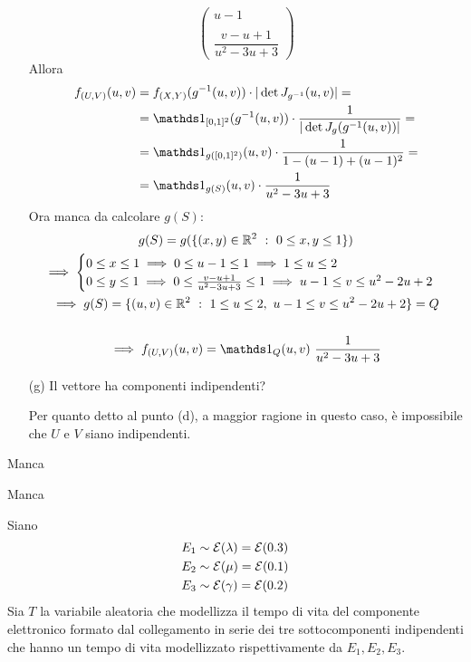 \begin{enumerate}
\[\begin{pmatrix}
u-1 \\ \, \\\dfrac{v-u+1}{u^2-3u+3}
\end{pmatrix}
\]
Allora
\begin{gather*}
\begin{aligned}
f_{(U,V)}(u,v)&=\fXY(g^{-1}(u,v))\cdot |\det J_{g^{-1}}(u,v)|=\\
&=\Ind_{[0,1]^2}(g^{-1}(u,v))\cdot\frac{1}{|\det J_g(g^{-1}(u,v))|}=\\
&=\Ind_{g([0,1]^2)}(u,v)\cdot\frac{1}{1-(u-1)+(u-1)^2}=\\
&=\Ind_{g(S)}(u,v)\cdot\frac{1}{u^2-3u+3}
\end{aligned}
\end{gather*}
Ora manca da calcolare $g(S)$:
\begin{gather*}
g(S)=g(\{(x,y)\in\RR^2\ :\ 0\leq x,y\leq 1 \}) \\
\implies \begin{cases}0\leq x\leq 1\implies 0\leq u-1\leq 1\implies 1\leq u \leq 2 \\ 0\leq y\leq 1\implies 0\leq \frac{v-u+1}{u^2-3u+3} \leq 1 \implies u-1\leq v\leq u^2-2u+2   \end{cases} \\
\implies g(S)=\{(u,v)\in\RR^2\ :\ 1\leq u \leq 2,\ u-1\leq v\leq u^2-2u+2 \}=Q\\
\, \\
\implies f_{(U,V)}(u,v)=\Ind_Q(u,v)\ \frac{1}{u^2-3u+3}
\end{gather*}

\item [(g)] Il vettore ha componenti indipendenti?

Per quanto detto al punto (d), a maggior ragione in questo caso, è impossibile che $U$ e $V$ siano indipendenti.

\end{enumerate}

\Soluzione{}
Manca

\Soluzione{}
Manca

\Soluzione{}
Siano 
\begin{align*}
E_1&\sim\mathcal{E}(\lambda)=\mathcal{E}(0.3) \\
E_2&\sim\mathcal{E}(\mu)=\mathcal{E}(0.1) \\
E_3&\sim\mathcal{E}(\gamma)=\mathcal{E}(0.2)
\end{align*}
Sia $T$ la variabile aleatoria che modellizza il tempo di vita del componente elettronico formato dal collegamento in serie dei tre sottocomponenti indipendenti che hanno un tempo di vita modellizzato rispettivamente da $E_1,E_2,E_3$.

